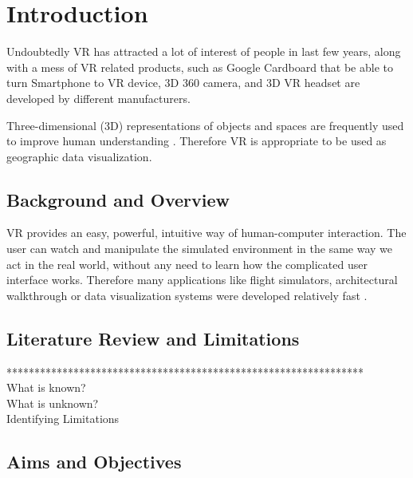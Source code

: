 \label{chapter-introduction}
\chapter{Introduction}

Undoubtedly VR has attracted a lot of interest of people in last few years, along with a mess of VR related products, such as Google Cardboard that be able to turn Smartphone to VR device, 3D 360 camera, and 3D VR headset are developed by different manufacturers. 

Three-dimensional (3D) representations of objects and spaces are frequently used to improve human understanding \parencite{tuttle.virtual-globes.2008}. Therefore VR is appropriate to be used as geographic data visualization.  

\section{Background and Overview}

VR provides an easy, powerful, intuitive way of human-computer interaction. The user can watch and manipulate the simulated environment in the same way we act in the real world, without any need to learn how the complicated user interface works. Therefore many applications like flight simulators, architectural walkthrough or data visualization systems were developed relatively fast \parencite{mazuryk.virtual-reality.1996}.

\section{Literature Review and Limitations}

****************************************************************\\%
What is known?\\
What is unknown?\\
Identifying Limitations\\

\section{Aims and Objectives}

